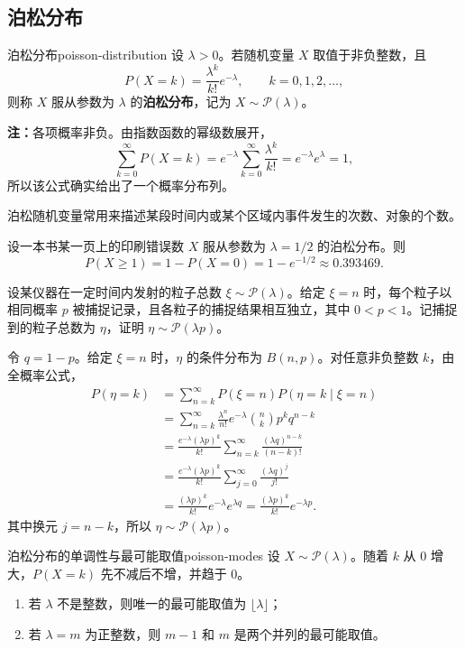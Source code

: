 \subsection*{泊松分布}

\begin{mydefinition}{泊松分布}{poisson-distribution}
设 $\lambda>0$。若随机变量 $X$ 取值于非负整数，且
\[
P(X=k)=\frac{\lambda^k}{k!}e^{-\lambda},
\qquad k=0,1,2,\ldots,
\]
则称 $X$ 服从参数为 $\lambda$ 的\textbf{泊松分布}，记为 $X\sim\mathcal P(\lambda)$。
\end{mydefinition}

\textbf{注：}\quad 各项概率非负。由指数函数的幂级数展开，
\[
\sum_{k=0}^{\infty}P(X=k)
=e^{-\lambda}\sum_{k=0}^{\infty}\frac{\lambda^k}{k!}
=e^{-\lambda}e^\lambda=1,
\]
所以该公式确实给出了一个概率分布列。

泊松随机变量常用来描述某段时间内或某个区域内事件发生的次数、对象的个数。

\begin{example}[一页上至少有一处印刷错误]
设一本书某一页上的印刷错误数 $X$ 服从参数为 $\lambda=1/2$ 的泊松分布。则
\[
P(X\geq1)=1-P(X=0)=1-e^{-1/2}\approx0.393469.
\]
\end{example}

\begin{example}[泊松粒子数的独立捕捉]
设某仪器在一定时间内发射的粒子总数 $\xi\sim\mathcal P(\lambda)$。给定 $\xi=n$ 时，每个粒子以相同概率 $p$ 被捕捉记录，且各粒子的捕捉结果相互独立，其中 $0<p<1$。记捕捉到的粒子总数为 $\eta$，证明 $\eta\sim\mathcal P(\lambda p)$。

令 $q=1-p$。给定 $\xi=n$ 时，$\eta$ 的条件分布为 $B(n,p)$。对任意非负整数 $k$，由全概率公式，
\[
\begin{aligned}
P(\eta=k)
&=\sum_{n=k}^{\infty}P(\xi=n)P(\eta=k\mid\xi=n)\\
&=\sum_{n=k}^{\infty}\frac{\lambda^n}{n!}e^{-\lambda}
\binom nk p^kq^{n-k}\\
&=\frac{e^{-\lambda}(\lambda p)^k}{k!}
\sum_{n=k}^{\infty}\frac{(\lambda q)^{n-k}}{(n-k)!}\\
&=\frac{e^{-\lambda}(\lambda p)^k}{k!}
\sum_{j=0}^{\infty}\frac{(\lambda q)^j}{j!}\\
&=\frac{(\lambda p)^k}{k!}e^{-\lambda}e^{\lambda q}
=\frac{(\lambda p)^k}{k!}e^{-\lambda p}.
\end{aligned}
\]
其中换元 $j=n-k$，所以 $\eta\sim\mathcal P(\lambda p)$。
\end{example}

\begin{proposition}{泊松分布的单调性与最可能取值}{poisson-modes}
设 $X\sim\mathcal P(\lambda)$。随着 $k$ 从 $0$ 增大，$P(X=k)$ 先不减后不增，并趋于 $0$。
\begin{enumerate}
    \item 若 $\lambda$ 不是整数，则唯一的最可能取值为 $\lfloor\lambda\rfloor$；
    \item 若 $\lambda=m$ 为正整数，则 $m-1$ 和 $m$ 是两个并列的最可能取值。
\end{enumerate}
\end{proposition}

